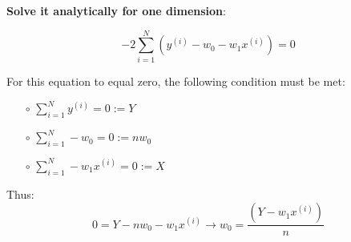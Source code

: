 \documentclass{article}
\newenvironment{cheatformula}[1][כותרת]{
    \begin{minipage}{\linewidth}
    \textbf{#1}:
}{
    \end{minipage}\\[0ex]
}
\begin{document}
\begin{multicols*}{2}
\begin{cheatformula}[Solve it analytically for one dimension]
\begin{equation}
-2 \sum_{i=1}^{N}(y^{(i)} -  w_{0} - w_{1}x^{(i)}) = 0
\end{equation}

For this equation to equal zero, the following condition must be met:
\begin{itemize}
\item[$\circ$] $\sum_{i=1}^{N}y^{(i)} = 0 := Y$ 
\item[$\circ$] $\sum_{i=1}^{N}-w_{0}  = 0 := n w_{0} $ 
\item[$\circ$] $\sum_{i=1}^{N}-w_{1}x^{(i)}  = 0 := X $ 
\end{itemize}
Thus:
\begin{equation}
0 = Y - n w_{0} -w_{1}x^{(i)} \longrightarrow  w_{0} = \frac{(Y -w_{1}x^{(i)})}{n}
\end{equation}
\end{cheatformula}


\pagebreak




\end{multicols*}
\newpage
\end{document}
